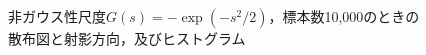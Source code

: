 \documentclass[class=jsarticle, crop=false, dvipdfmx, fleqn]{standalone}
\begin{document}
\begin{figure}
\begin{minipage}{0.45\linewidth}
\begin{figure}[H]
            \label{fig:exp_n10000_hist}
        \end{figure}
    \end{minipage}
    \caption{非ガウス性尺度\(G(s) = -\exp(-s^2/2)\)，標本数10,000のときの散布図と射影方向，及びヒストグラム}
    \label{fig:exp_n10000}
\end{figure}
\end{document}
